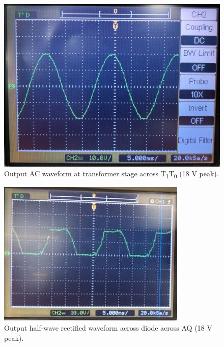 \documentclass[journal,12pt,twocolumn]{IEEEtran}
\begin{document}
\begin{figure}[!ht]
	\includegraphics[width=\columnwidth]{figs/transformer.jpg}
	\caption{Output AC waveform at transformer stage across T\textsubscript{1}T\textsubscript{0} (18 V peak).}
	\label{fig:transformer}
\end{figure}

\begin{figure}[!ht]
	\includegraphics[width=\columnwidth]{figs/rectifier.jpg}
	\caption{Output half-wave rectified waveform across diode across AQ (18 V peak).}
	\label{fig:rectifier}
\end{figure}
\end{document}
